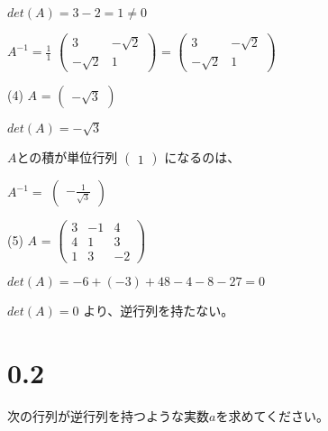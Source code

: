 \documentclass{jsarticle}
\begin{document}
\begin{description}
\begin{spacing}{1.2}
                $ det(A) = 3 - 2 = 1 \neq 0 $

                $ A^{-1} = \frac{1}{1} $
                $ \begin{pmatrix}
                    3 & -\sqrt{2} \\
                    -\sqrt{2} & 1
                \end{pmatrix} $
                =
                $ \begin{pmatrix}
                    3 & -\sqrt{2} \\
                    -\sqrt{2} & 1
                \end{pmatrix} $

            \item[(4)]
                $ A $ =
                $ \begin{pmatrix}
                    -\sqrt{3}
                \end{pmatrix} $

                $ det(A) = -\sqrt{3} $

                $ A $との積が単位行列
                $ \begin{pmatrix}
                    1
                \end{pmatrix} $
                になるのは、

                $ A^{-1} = $
                $ \begin{pmatrix}
                    -\frac{1}{\sqrt{3}}
                \end{pmatrix} $

            \item[(5)]
                $ A $ =
                $ \begin{pmatrix}
                    3 & -1 & 4 \\
                    4 & 1 & 3 \\
                    1 & 3 & -2
                \end{pmatrix} $

                $ det(A) = -6 + (-3) + 48 - 4 - 8 - 27 = 0 $

                $ det(A) = 0 $ より、逆行列を持たない。

		\end{spacing}
	\end{description}

	\section*{0.2}
	次の行列が逆行列を持つような実数$ a $を求めてください。
\end{document}
